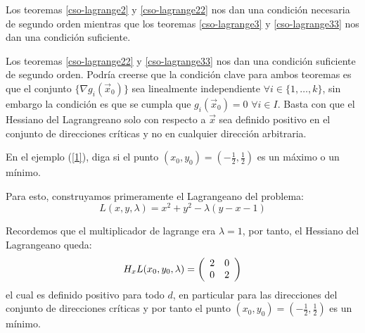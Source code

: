 \begin{nota}
Los teoremas \ref{cso-lagrange2} y \ref{cso-lagrange22} nos dan una condici\'on necesaria de segundo orden mientras que los teoremas \ref{cso-lagrange3} y \ref{cso-lagrange33} nos dan una condici\'on suficiente.
\end{nota}

Los teoremas \ref{cso-lagrange22} y \ref{cso-lagrange33} nos dan una condici\'on suficiente de segundo orden. Podr\'ia creerse que la condici\'on clave para ambos teoremas es que el conjunto $\{\nabla g_i (\vec{x}_0)\}$ sea linealmente independiente $\forall i\in\{1,\ldots, k\}$, sin embargo la condici\'on es que se cumpla que $g_i (\vec{x}_0)=0$ $\forall i\in I$. Basta con que el Hessiano del Lagrangreano solo con respecto a $\vec{x}$ sea definido positivo en el conjunto de direcciones cr\'iticas y no en cualquier direcci\'on arbitraria.

\begin{ejemplo}
En el ejemplo (\ref{1}), diga si el punto $(x_{0},y_{0})=(-\frac{1}{2}%
,\frac{1}{2})$ es un m\'aximo o un m\'inimo.

\begin{solucion}
Para esto, construyamos primeramente el Lagrangeano del problema:%
$$L(x,y,\lambda) = x^{2}+y^{2}-\lambda(y-x-1)$$

Recordemos que el multiplicador de lagrange era $\lambda=1$, por tanto, el
Hessiano del Lagrangeano queda:%
\[
H_{x}L(x_{0},y_{0},\lambda)=\left(
\begin{array}
[c]{ll}%
2 & 0\\
0 & 2
\end{array}
\right)
\]
el cual es definido positivo para todo $d$, en particular para las direcciones
del conjunto de direcciones cr\'iticas y por tanto el punto $(x_{0}%
,y_{0})=(-\frac{1}{2},\frac{1}{2})$ es un m\'inimo.
\end{solucion}
\end{ejemplo}

